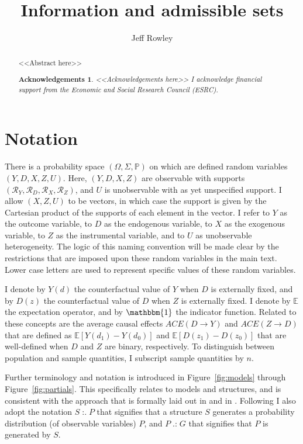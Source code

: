 \documentclass[10pt,a4paper,twoside]{article}
\title{Information and admissible sets}
\author{Jeff Rowley}
\newtheorem*{Acknowledgements}{Acknowledgements}
\DeclareMathOperator*{\generates}{:.}
\DeclareMathOperator*{\generated}{.:}
\numberwithin{equation}{subsection}
\newcommand{\ESRC}{I acknowledge financial support from the Economic and Social Research Council (ESRC).}
\begin{document}
\maketitle
\vspace{10mm}
\begin{abstract}
\noindent <<Abstract here>>
\begin{Acknowledgements}
<<Acknowledgements here>>
\ESRC
\end{Acknowledgements}
\end{abstract}
\vspace{5mm}
\section*{Notation}
There is a probability space $(\Omega,\Sigma,\mathbb{P})$ on which are defined random variables $(Y,D,X,Z,U)$. Here, $(Y,D,X,Z)$ are observable with supports $(\mathcal{R}_Y,\mathcal{R}_D,\mathcal{R}_X,\mathcal{R}_Z)$, and $U$ is unobservable with as yet unspecified support. I allow $(X,Z,U)$ to be vectors, in which case the support is given by the Cartesian product of the supports of each element in the vector. I refer to $Y$ as the outcome variable, to $D$ as the endogenous variable, to $X$ as the exogenous variable, to $Z$ as the instrumental variable, and to $U$ as unobservable heterogeneity. The logic of this naming convention will be made clear by the restrictions that are imposed upon these random variables in the main text. Lower case letters are used to represent specific values of these random variables.

I denote by $Y(d)$ the counterfactual value of $Y$ when $D$ is externally fixed, and by $D(z)$ the counterfactual value of $D$ when $Z$ is externally fixed. I denote by $\mathbb{E}$ the expectation operator, and  by $\mathbbm{1}$ the indicator function. Related to these concepts are the average causal effects $ACE(D\rightarrow Y)$ and $ACE(Z\rightarrow D)$ that are defined as $\mathbb{E}[Y(d_1)-Y(d_0)]$ and $\mathbb{E}[D(z_1)-D(z_0)]$ that are well-defined when $D$ and $Z$ are binary, respectively. To distinguish between population and sample quantities, I subscript sample quantities by $n$. 

Further terminology and notation is introduced in Figure~\ref{fig:models} through Figure~\ref{fig:partials}. This specifically relates to models and structures, and is consistent with the approach that is formally laid out in \cite{h50} and in \cite{krE50}. Following \cite{h50} I also adopt the notation $S\generates P$ that signifies that a structure $S$ generates a probability distribution (of observable variables) $P$, and $P\generated G$ that signifies that $P$ is generated by $S$. 
\end{document}
